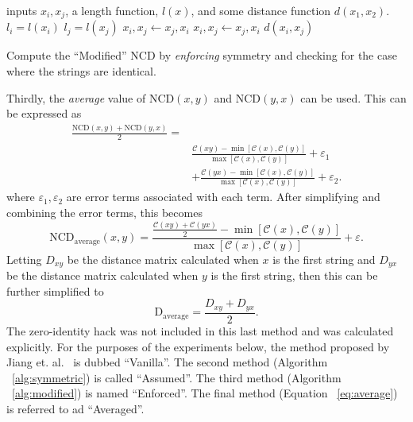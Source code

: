 \documentclass[conference]{IEEEtran}
\begin{document}
\begin{algorithm}
    \begin{algorithmic}
        \Require inputs $x_i, x_j$, a length function, $l(x)$, and some distance function $d(x_1,x_2)$.
         
            \State {}
        \Else  {}
            \State $l_i = l(x_i)$
            \State $l_j = l(x_j)$
                 \State $x_i, x_j \gets x_j, x_i$ 
                 
                     \State $x_i, x_j \gets x_j, x_i$ 
                \EndIf
            \EndIf
            \State \Return $d(x_i, x_j)$
        \EndIf
    \end{algorithmic}
    \caption{Compute the ``Modified'' NCD by \textit{enforcing} symmetry and checking for the case where the strings are identical.}
    \label{alg:modified}
\end{algorithm}

Thirdly, the \textit{average} value of NCD$(x,y)$ and NCD$(y,x)$ can be used. This can be expressed as
\begin{align*}
\frac{\text{NCD}(x,y) + \text{NCD}(y,x)}{2}= \\
    & \frac{\mathcal{C}(xy) - \min[\mathcal{C}(x), \mathcal{C}(y)]}{\max[\mathcal{C}(x), \mathcal{C}(y)]} + \varepsilon_1 \\
    &+  \frac{\mathcal{C}(yx) - \min[\mathcal{C}(x), \mathcal{C}(y)]}{\max[\mathcal{C}(x), \mathcal{C}(y)]} + \varepsilon_2.
\end{align*}
where $\varepsilon_1, \varepsilon_2$ are error terms associated with each term. 
After simplifying and combining the error terms, this becomes
\begin{equation}
    \text{NCD}_{\text{average}}(x, y) = \frac{\frac{\mathcal{C}(xy) + \mathcal{C}(yx)}{2} - \min[\mathcal{C}(x), \mathcal{C}(y)]}{\max[\mathcal{C}(x), \mathcal{C}(y)]} + \varepsilon.
\end{equation}
Letting $D_{xy}$ be the distance matrix calculated when $x$ is the first string and $D_{yx}$ be the distance matrix calculated when $y$ is the first string, then this can be further simplified to
\begin{equation}
    \text{D}_{\text{average}} = \frac{D_{xy}  + D_{yx}}{2}.
    \label{eq:average}
\end{equation}
The zero-identity hack was not included in this last method and was calculated explicitly. 
For the purposes of the experiments below, the method proposed by Jiang et. al.~\cite{jiang2022less} is dubbed ``Vanilla''. 
The second method (Algorithm ~\ref{alg:symmetric}) is called ``Assumed''. 
The third method (Algorithm ~\ref{alg:modified}) is named ``Enforced''. 
The final method (Equation ~\ref{eq:average}) is referred to ad ``Averaged''. 
\end{document}
